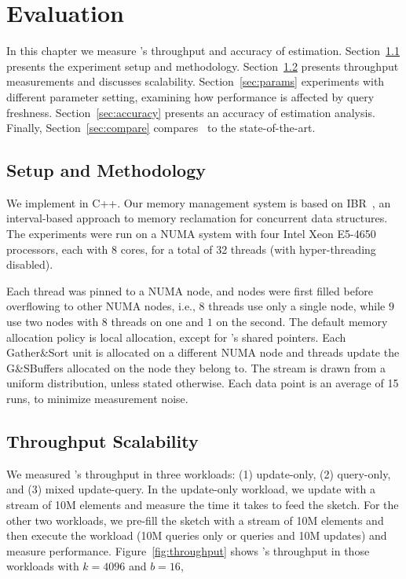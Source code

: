 \chapter{Evaluation}
\label{chap:eval}

In this chapter we measure \mysketch's throughput and accuracy of estimation. 
Section~\ref{sec:setup} presents the experiment setup and methodology.
Section~\ref{sec:tput} presents throughput measurements and discusses scalability.
Section~\ref{sec:params} experiments with different parameter setting, examining how performance is affected by query freshness. 
Section~\ref{sec:accuracy} presents an accuracy of estimation analysis.
Finally, Section~\ref{sec:compare} compares \mysketch\ to the state-of-the-art. 

\section{Setup and Methodology}
\label{sec:setup}
We implement \mysketch in C++. Our memory management system is based on \acrshort{IBR}~\cite{Haosen_2018_IBR}, an interval-based approach to memory reclamation for concurrent data structures. 
The experiments were run on a NUMA system with four Intel Xeon E5-4650 processors, each with 8 cores, for a total of 32 threads (with hyper-threading disabled).


Each thread was pinned to a NUMA node, and nodes were first filled before overflowing to other NUMA nodes, i.e., $8$ threads use only a single node, while $9$ use two nodes with $8$ threads on one and $1$ on the second. The default memory allocation policy is local allocation, except for \mysketch's shared pointers. Each Gather\&Sort unit is allocated on a different NUMA node and threads update the G\&SBuffers allocated on the node they belong to.
The stream is drawn from a uniform distribution, unless stated otherwise. Each data point is an average of 15 runs, to minimize measurement noise.

 
\section{Throughput Scalability}
\label{sec:tput} 
We measured \mysketch's throughput in three workloads:
(1) update-only, (2) query-only, and (3) mixed update-query. In the update-only workload, we update \mysketch with a stream of 10M elements and measure the time it takes to feed the sketch. For the other two workloads, we pre-fill the sketch with a stream of 10M elements and then execute the workload (10M queries only or queries and 10M updates) and measure performance. Figure~\ref{fig:throughput} shows \mysketch's throughput in those workloads with $k = 4096$ and $b = 16$,

